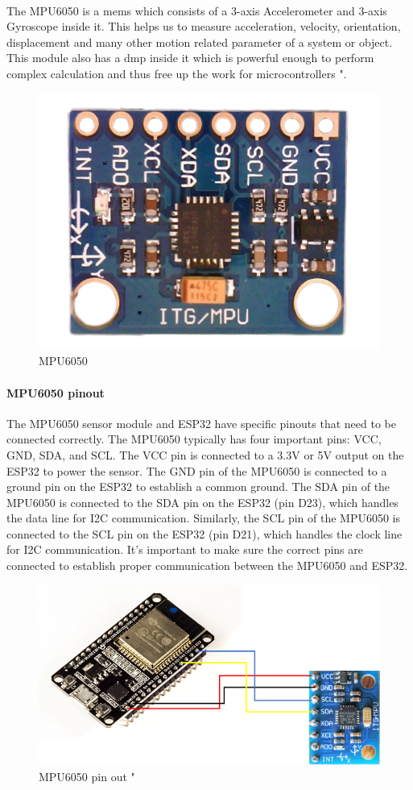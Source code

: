 \paragraph{}
The MPU6050 is a \ac{mems} which consists of a 3-axis Accelerometer and 3-axis Gyroscope inside it. This helps us to measure acceleration, velocity, orientation, displacement and many other motion related parameter of a system or object. This module also has a \ac{dmp} inside it which is powerful enough to perform complex calculation and thus free up the work for microcontrollers "\cite{mpu}.
\begin{figure}[h]
	\centering
	\includegraphics[width=0.6\linewidth]{images/mpu6050}
	\caption{MPU6050}
	\label{fig:mpu6050}
\end{figure}
\paragraph{MPU6050 pinout}
The MPU6050 sensor module and ESP32 have specific pinouts that need to be connected correctly. The MPU6050 typically has four important pins: VCC, GND, SDA, and SCL. The VCC pin is connected to a 3.3V or 5V output on the ESP32 to power the sensor. The GND pin of the MPU6050 is connected to a ground pin on the ESP32 to establish a common ground. The SDA pin of the MPU6050 is connected to the SDA pin on the ESP32 (pin D23), which handles the data line for I2C communication. Similarly, the SCL pin of the MPU6050 is connected to the SCL pin on the ESP32 (pin D21), which handles the clock line for I2C communication. It's important to make sure the correct pins are connected to establish proper communication between the MPU6050 and ESP32.
\begin{figure}[h]
	\centering
	\includegraphics[width=0.6\linewidth]{images/mpu6050-pinout}
	\caption{MPU6050 pin out "\cite{mpu-pinout}}
	\label{fig:mpu6050-pinout}
\end{figure}